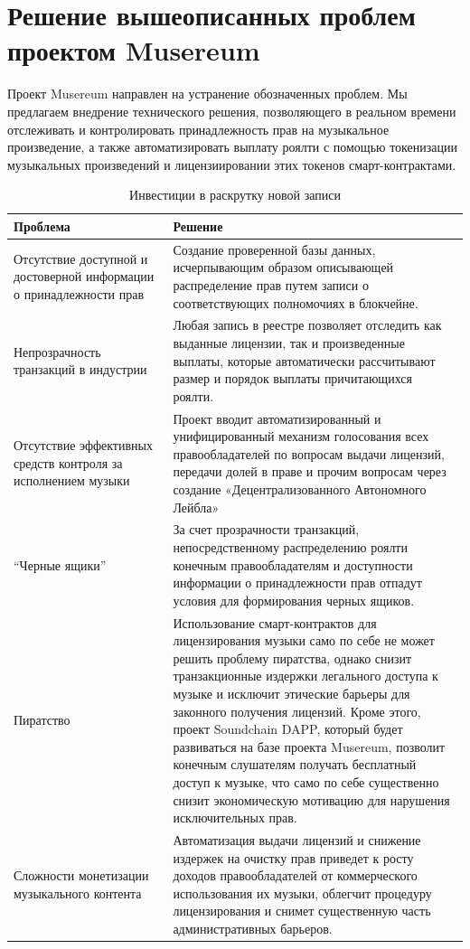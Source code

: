 \documentclass[12pt]{report}
\begin{document}
\section{Решение вышеописанных проблем проектом Musereum}
\label{industry-solution}
Проект Musereum направлен на устранение обозначенных проблем. Мы предлагаем внедрение технического решения, позволяющего в реальном времени отслеживать и контролировать принадлежность прав на музыкальное произведение, а также автоматизировать выплату роялти с помощью токенизации музыкальных произведений и лицензиировании этих токенов смарт-контрактами. 

\begin{table}[h]
\centering
\caption{Инвестиции в раскрутку новой записи}
\begin{tabular}{p{0.35\linewidth}p{0.65\linewidth}}
\toprule
Проблема & Решение \\
\bottomrule
\midrule
Отсутствие доступной и достоверной информации о принадлежности прав &
Создание проверенной базы данных, исчерпывающим образом описывающей распределение прав путем записи о соответствующих полномочиях в блокчейне. \\
\hline
Непрозрачность транзакций в индустрии & 
Любая запись в реестре позволяет отследить как выданные лицензии, так и произведенные выплаты, которые автоматически рассчитывают размер и порядок выплаты причитающихся роялти. \\
\hline
Отсутствие эффективных средств контроля за исполнением музыки &
Проект вводит автоматизированный и унифицированный механизм голосования всех правообладателей по вопросам выдачи лицензий, передачи долей в праве и прочим вопросам через создание «Децентрализованного Автономного Лейбла» \\
\hline
“Черные ящики” & 
За счет прозрачности транзакций, непосредственному распределению роялти конечным правообладателям и доступности информации о принадлежности прав отпадут условия для формирования черных ящиков. \\
\hline
Пиратство &
Использование смарт-контрактов для лицензирования музыки само по себе не может решить проблему пиратства, однако снизит транзакционные издержки легального доступа к музыке и исключит этические барьеры для законного получения лицензий. Кроме этого, проект Soundchain DAPP, который будет развиваться на базе проекта Musereum, позволит конечным слушателям получать бесплатный доступ к музыке, что само по себе существенно снизит экономическую мотивацию для нарушения исключительных прав. \\
\hline
Сложности монетизации музыкального контента &
Автоматизация выдачи лицензий и снижение издержек на очистку прав приведет к росту доходов правообладателей от коммерческого использования их музыки, облегчит процедуру лицензирования и снимет существенную часть административных барьеров.


\end{tabular}
\end{table}
\end{document}
